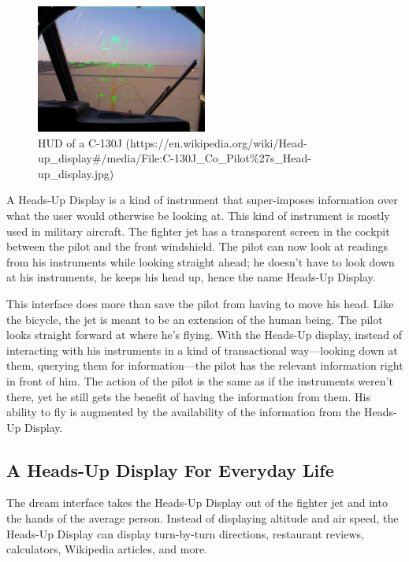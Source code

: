 \documentclass[a4paper,12pt]{article}
\begin{document}
\begin{figure}
\centering
\includegraphics[width=0.5\textwidth]{jethud}
\caption{HUD of a C-130J (https://en.wikipedia.org/wiki/Head-up\_display\#/media/File:C-130J\_Co\_Pilot\%27s\_Head-up\_display.jpg)}
\end{figure}

A Heads-Up Display is a kind of instrument that super-imposes information over what the user would otherwise be looking at. This kind of instrument is mostly used in military aircraft. The fighter jet has a transparent screen in the cockpit between the pilot and the front windshield. The pilot can now look at readings from his instruments while looking straight ahead; he doesn't have to look down at his instruments, he keeps his head up, hence the name Heads-Up Display.

This interface does more than save the pilot from having to move his head. Like the bicycle, the jet is meant to be an extension of the human being. The pilot looks straight forward at where he's flying. With the Heads-Up display, instead of interacting with his instruments in a kind of transactional way---looking down at them, querying them for information---the pilot has the relevant information right in front of him. The action of the pilot is the same as if the instruments weren't there, yet he still gets the benefit of having the information from them. His ability to fly is augmented by the availability of the information from the Heads-Up Display.

\subsection{A Heads-Up Display For Everyday Life}

The dream interface takes the Heads-Up Display out of the fighter jet and into the hands of the average person. Instead of displaying altitude and air speed, the Heads-Up Display can display turn-by-turn directions, restaurant reviews, calculators, Wikipedia articles, and more.
\end{document}
